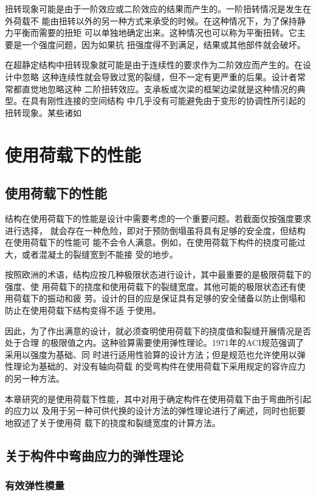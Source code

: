 \documentclass[12pt,a4paper]{book}
\begin{document}
扭转现象可能是由于一阶效应或二阶效应的结果而产生的。一阶扭转情况是发生在外荷载不
能由扭转以外的另一种方式来承受的时候。在这种情况下，为了保持静力平衡而需要的扭矩
可以单独地确定出来。这种情况也可以称为平衡扭转。它主要是一个强度问题，因为如果抗
扭强度得不到满足，结果或其他部件就会破坏。

在超静定结构中扭转现象就可能是由于连续性的要求作为二阶效应而产生的。在设计中忽略
这种连续性就会导致过宽的裂缝，但不一定有更严重的后果。设计者常常都直觉地忽略这种
二阶扭转效应。支承板或次梁的框架边梁就是这种情况的典型。在具有刚性连接的空间结构
中几乎没有可能避免由于变形的协调性所引起的扭转现象。某些诸如

\chapter{使用荷载下的性能}

\section{使用荷载下的性能}

结构在使用荷载下的性能是设计中需要考虑的一个重要问题。若截面仅按强度要求进行选择，
就会存在一种危险，即对于预防倒塌虽将具有足够的安全度，但结构在使用荷载下的性能可
能不会令人满意。例如，在使用荷载下构件的挠度可能过大，或者混凝土的裂缝宽到不能接
受的地步。

按照欧洲的术语，结构应按几种极限状态进行设计，其中最重要的是极限荷载下的强度、使
用荷载下的挠度和使用荷载下的裂缝宽度。其他可能的极限状态还有使用荷载下的振动和疲
劳。设计的目的应是保证具有足够的安全储备以防止倒塌和防止在使用荷载下结构变得不适
于使用。

因此，为了作出满意的设计，就必须查明使用荷载下的挠度值和裂缝开展情况是否处于合理
的极限值之内。这种验算需要使用弹性理论。1971年的ACI规范强调了采用以强度为基础、同
时进行适用性验算的设计方法；但是规范也允许使用以弹性理论为基础的、对没有轴向荷载
的受弯构件在使用荷载下采用规定的容许应力的另一种方法。

本章研究的是使用荷载下性能，其中对用于确定构件在使用荷载下由于弯曲所引起的应力以
及用于另一种可供代换的设计方法的弹性理论进行了阐述，同时也扼要地叙述了关于使用荷
载下的挠度和裂缝宽度的计算方法。

\section{关于构件中弯曲应力的弹性理论}

\subsection{有效弹性模量}
\end{document}
